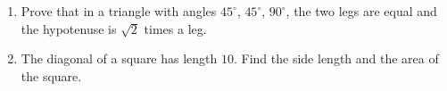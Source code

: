 \begin{enumerate}
\item[(a)] Prove that in a triangle with angles $45^\circ$, $45^\circ$, $90^\circ$, the two legs are equal and the hypotenuse is $\sqrt2$ times a leg.
\item[(b)] The diagonal of a square has length $10$. Find the side length and the area of the square.
\end{enumerate}
